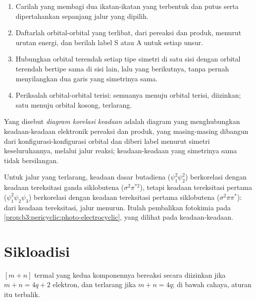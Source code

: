 \begin{method}\label{met:b3:pericyclic:correlation-diagram}
\begin{enumerate}
  \item Carilah  yang membagi dua ikatan-ikatan yang terbentuk dan putus serta
        dipertahankan sepanjang jalur yang dipilih.
  \item Daftarlah orbital-orbital yang terlibat, dari pereaksi dan produk, menurut urutan
        energi, dan berilah label S atau A untuk setiap unsur.
  \item Hubungkan orbital terendah setiap tipe simetri di satu sisi dengan orbital terendah
        bertipe sama di sisi lain, lalu yang berikutnya, tanpa pernah menyilangkan dua garis yang
        simetrinya sama.
  \item Periksalah orbital-orbital terisi: semuanya menuju orbital terisi, diizinkan; satu menuju orbital kosong,
        terlarang.
\end{enumerate}
\end{method}

\begin{definition}\label{def:b3:pericyclic:state-correlation}
Yang disebut \emph{diagram korelasi keadaan} adalah diagram yang menghubungkan
keadaan-keadaan elektronik pereaksi dan produk, yang masing-masing dibangun dari konfigurasi-konfigurasi
orbital dan diberi label menurut simetri keseluruhannya, melalui jalur reaksi; keadaan-keadaan yang
simetrinya sama tidak bersilangan.
\end{definition}

Untuk jalur  yang terlarang, keadaan dasar butadiena ($\psi_1^2\psi_2^2$)
berkorelasi dengan keadaan tereksitasi ganda siklobutena ($\sigma^2\pi^{*2}$), tetapi keadaan tereksitasi
pertama ($\psi_1^2\psi_2\psi_3$) berkorelasi dengan keadaan tereksitasi pertama siklobutena ($\sigma^2\pi\pi^*$): dari
keadaan tereksitasi, jalur  menurun. Itulah pembalikan fotokimia
pada \cref{prop:b3:pericyclic:photo-electrocyclic}, yang dilihat pada keadaan-keadaan.

\section{Sikloadisi}

\begin{theorem}[Sikloadisi]\label{thm:b3:pericyclic:cycloaddition}
 $[m + n]$ termal yang kedua komponennya bereaksi secara 
diizinkan jika $m + n = 4q + 2$ elektron, dan terlarang jika $m + n = 4q$; di bawah cahaya,
aturan itu terbalik.
\end{theorem}

